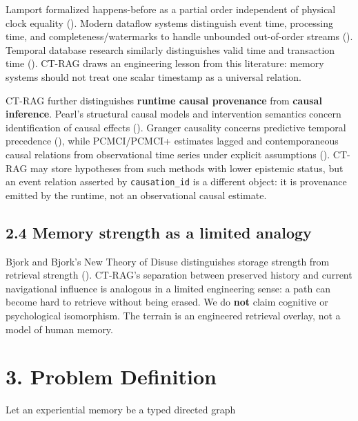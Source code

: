 \documentclass[
  11pt,
]{article}
\begin{document}
Lamport formalized happens-before as a partial order independent of
physical clock equality ().
Modern dataflow systems distinguish event time, processing time, and
completeness/watermarks to handle unbounded out-of-order streams
(). Temporal
database research similarly distinguishes valid time and transaction
time ().
CT-RAG draws an engineering lesson from this literature: memory systems
should not treat one scalar timestamp as a universal relation.

CT-RAG further distinguishes \textbf{runtime causal provenance} from
\textbf{causal inference}. Pearl's structural causal models and
intervention semantics concern identification of causal effects
(). Granger causality
concerns predictive temporal precedence
(), while PCMCI/PCMCI+
estimates lagged and contemporaneous causal relations from observational
time series under explicit assumptions
(). CT-RAG may store hypotheses
from such methods with lower epistemic status, but an event relation
asserted by \texttt{causation\_id} is a different object: it is
provenance emitted by the runtime, not an observational causal estimate.

\subsection{2.4 Memory strength as a limited
analogy}\label{memory-strength-as-a-limited-analogy}

Bjork and Bjork's New Theory of Disuse distinguishes storage strength
from retrieval strength (). CT-RAG's separation between preserved history and current
navigational influence is analogous in a limited engineering sense: a
path can become hard to retrieve without being erased. We do
\textbf{not} claim cognitive or psychological isomorphism. The terrain
is an engineered retrieval overlay, not a model of human memory.

\section{3. Problem Definition}\label{problem-definition}

Let an experiential memory be a typed directed graph
\end{document}
